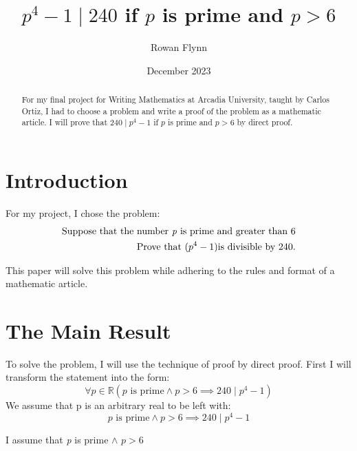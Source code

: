 \documentclass{article}
\title{$p^4 - 1 \mid 240$ if $p$ is prime and $p > 6$}
\author{Rowan Flynn}
\affil{Arcadia University}
\date{December 2023}
\begin{document}
\maketitle

\begin{abstract}
    For my final project for Writing Mathematics at Arcadia University, taught by Carlos Ortiz, I had to choose a problem and write a proof of the problem as a mathematic article.
    I will prove that $240 \mid p^4 - 1$ if $p$ is prime and $p > 6$ by direct proof.
\end{abstract}

\section{Introduction}

For my project, I chose the problem:
\begin{equation*}
\begin{split}
    \text{Suppose that the number \textit{p} is prime and greater than }6 \\ \text{Prove that }(p^4 - 1) \text{is divisible by }240.
\end{split}
\end{equation*} 

This paper will solve this problem while adhering to the rules and format of a mathematic article.

\section{The Main Result}
To solve the problem, I will use the technique of proof by direct proof. First I will transform the statement into the form:
\begin{equation}
    \forall p \in \mathbb{R} (p \text{ is prime} \land p > 6 \implies 240 \mid p^4-1)
\end{equation}
We assume that p is an arbitrary real to be left with:
\begin{equation}
    p \text{ is prime} \land p > 6 \implies 240 \mid p^4-1
\end{equation}

I assume that \textit{p} is prime $\land$ $ p > 6$
\end{document}
